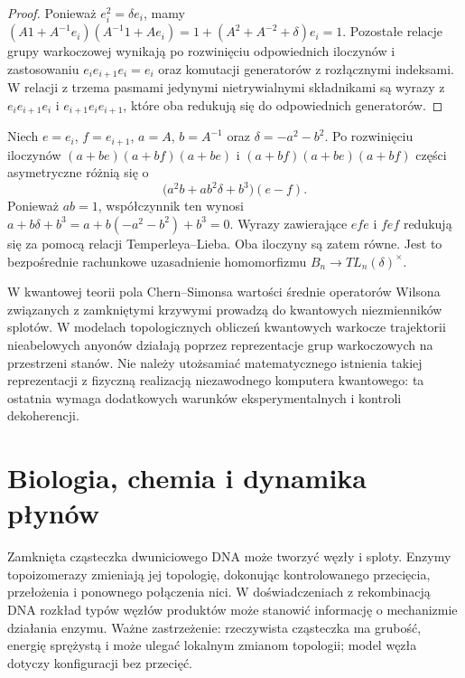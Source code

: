 \begin{proof}
Ponieważ $e_i^2=\delta e_i$, mamy
$(A1+A^{-1}e_i)(A^{-1}1+Ae_i)
=1+(A^2+A^{-2}+\delta)e_i=1$.
Pozostałe relacje grupy warkoczowej wynikają po
rozwinięciu odpowiednich iloczynów i zastosowaniu
$e_ie_{i+1}e_i=e_i$ oraz komutacji generatorów
z rozłącznymi indeksami. W relacji z trzema pasmami
jedynymi nietrywialnymi składnikami są wyrazy
z $e_ie_{i+1}e_i$ i $e_{i+1}e_ie_{i+1}$, które
oba redukują się do odpowiednich generatorów.
\end{proof}

\begin{przyklad}
Niech $e=e_i$, $f=e_{i+1}$, $a=A$, $b=A^{-1}$ oraz
$\delta=-a^2-b^2$. Po rozwinięciu iloczynów
$(a+be)(a+bf)(a+be)$ i $(a+bf)(a+be)(a+bf)$
części asymetryczne różnią się o
\[
\bigl(a^2b+ab^2\delta+b^3\bigr)(e-f).
\]
Ponieważ $ab=1$, współczynnik ten wynosi
$a+b\delta+b^3=a+b(-a^2-b^2)+b^3=0$.
Wyrazy zawierające $efe$ i $fef$ redukują się za pomocą
relacji Temperleya--Lieba. Oba iloczyny są zatem równe.
Jest to bezpośrednie rachunkowe uzasadnienie homomorfizmu
$B_n\to TL_n(\delta)^\times$.
\end{przyklad}

\begin{uwaga}
W kwantowej teorii pola Chern--Simonsa wartości średnie
operatorów Wilsona związanych z zamkniętymi krzywymi
prowadzą do kwantowych niezmienników splotów. W modelach
topologicznych obliczeń kwantowych warkocze trajektorii
nieabelowych anyonów działają poprzez reprezentacje
grup warkoczowych na przestrzeni stanów.
Nie należy utożsamiać matematycznego istnienia takiej
reprezentacji z fizyczną realizacją niezawodnego
komputera kwantowego: ta ostatnia wymaga dodatkowych
warunków eksperymentalnych i kontroli dekoherencji.
\end{uwaga}

\section{Biologia, chemia i dynamika płynów}
\label{sec:kt-zastosowania}

\begin{przyklad}
Zamknięta cząsteczka dwuniciowego DNA może tworzyć
węzły i sploty. Enzymy topoizomerazy zmieniają jej
topologię, dokonując kontrolowanego przecięcia,
przełożenia i ponownego połączenia nici. W doświadczeniach
z rekombinacją DNA rozkład typów węzłów produktów
może stanowić informację o mechanizmie działania enzymu.
Ważne zastrzeżenie: rzeczywista cząsteczka ma grubość,
energię sprężystą i może ulegać lokalnym zmianom topologii;
model węzła dotyczy konfiguracji bez przecięć.
\end{przyklad}

